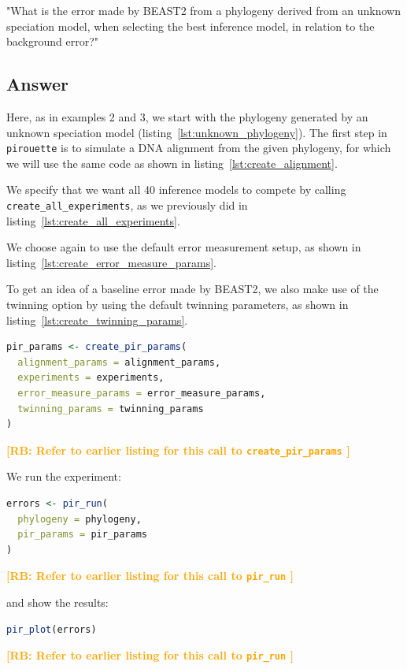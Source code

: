 \documentclass{article}
\newcommand{\richel}[1]{\textcolor{orange}{\textbf{[RB: #1]}}}
\begin{document}
"What is the error made by BEAST2 from a phylogeny 
derived from an unknown speciation model,
when selecting the best inference model, 
in relation to the background error?"

\subsection{Answer}

Here, as in examples 2 and 3, we start with the phylogeny 
generated by an unknown speciation model (listing~\ref{lst:unknown_phylogeny}). 
The first step in \verb;pirouette; is to simulate a DNA alignment 
from the given phylogeny, for which we will use the same code 
as shown in listing~\ref{lst:create_alignment}.

We specify that we want all 40 inference models to compete 
by calling \verb;create_all_experiments;,
as we previously did in listing~\ref{lst:create_all_experiments}.

We choose again to use the default error measurement setup,
as shown in listing~\ref{lst:create_error_measure_params}.

To get an idea of a baseline error made by BEAST2, 
we also make use of the twinning option by using the
default twinning parameters, as shown in 
listing~\ref{lst:create_twinning_params}.

\begin{lstlisting}[language=R, floatplacement=ht, frame=single]
pir_params <- create_pir_params(
  alignment_params = alignment_params,
  experiments = experiments,
  error_measure_params = error_measure_params,
  twinning_params = twinning_params
)
\end{lstlisting}
\richel{
  Refer to earlier listing for this call to \texttt{create\_pir\_params}
}

We run the experiment:

\begin{lstlisting}[language=R, floatplacement=ht, frame=single]
errors <- pir_run(
  phylogeny = phylogeny,
  pir_params = pir_params
)
\end{lstlisting}
\richel{
  Refer to earlier listing for this call to \texttt{pir\_run}
}

and show the results:

\begin{lstlisting}[language=R, floatplacement=ht, frame=single]
pir_plot(errors)
\end{lstlisting}
\richel{
  Refer to earlier listing for this call to \texttt{pir\_run}
}
\end{document}
